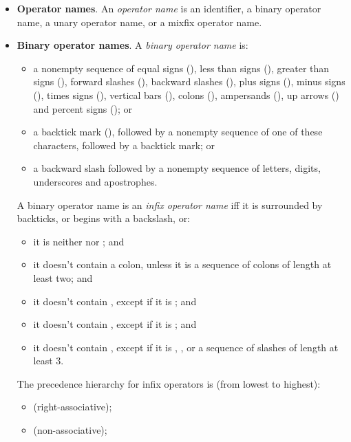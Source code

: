 \begin{itemize}
\item \textbf{Operator names}. An \emph{operator name} is an
  identifier, a binary operator name, a unary operator name, or
  a mixfix operator name.

\item \textbf{Binary operator names}. A \emph{binary operator name}
  is:
  \begin{itemize}
  \item a nonempty sequence of equal signs (\ec{=}), less
  than signs (\ec{<}), greater than signs (\ec{>}), forward slashes
  (\ec{/}), backward slashes (\ec{\\}), plus signs (\ec{+}), minus
  signs (\ec{-}), times signs (\ec{*}), vertical bars (\ec{|}), colons
  (\ec{:}), ampersands (\ec{&}), up arrows (\ec{^}) and percent signs
  (\ec{\%}); or

  \item a backtick mark (), followed by a nonempty sequence of one
    of these characters, followed by a backtick mark; or

  \item a backward slash followed by a nonempty sequence of letters,
    digits, underscores and apostrophes.
  \end{itemize}

  A binary operator name is an \emph{infix operator name} iff it is
  surrounded by backticks, or begins with a backslash, or:
  \begin{itemize}
  \item it is neither \ecn{<<} nor \ecn{>>}; and
  \item it doesn't contain a colon, unless it is a sequence of colons
    of length at least two; and
  \item it doesn't contain \ecn{=>}, except if it is \ecn{=>}; and
  \item it doesn't contain \ecn{|}, except if it is \ecn{||}; and
  \item it doesn't contain \ecn{/}, except if it is \ecn{/},
    \ecn{/\\}, or a sequence of slashes of length at least 3.
  \end{itemize}

  The precedence hierarchy for infix operators is (from lowest to highest):
  \begin{itemize}
  \item \ecn{=>} (right-associative);

  \item \ecn{<=>} (non-associative);


\end{itemize}
\end{itemize}
